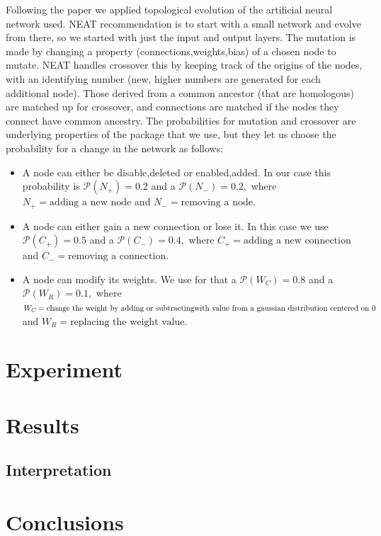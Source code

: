 \documentclass{article}
\begin{document}
Following the paper\cite{NEAT} we applied topological evolution of the artificial neural network used.
NEAT recommendation is to start with a small network and evolve from there, so we started with just the input and output layers.
The mutation is made by changing a property (connections,weights,bias) of a chosen node to mutate.
NEAT handles crossover this by keeping track of the origins of the nodes, with an identifying number (new, higher numbers are generated for each additional node).
Those derived from a common ancestor (that are homologous) are matched up for crossover, and connections are matched if the nodes they connect have common ancestry.
The probabilities for mutation and crossover are underlying properties of the package that we use, but they let us choose the probability for a change in the network as follows:
\begin{itemize}
  \item A node can either be disable,deleted or enabled,added.
In our case this probability is $\mathcal{P}(N_+)=0.2$ and a $\mathcal{P}(N_-)=0.2, $ where $N_+=\text{adding a new node}$ and $N_-=\text{removing a node}$.
  \item A node can either gain a new connection or lose it.
In this case we use $\mathcal{P}(C_+)=0.5$ and a $\mathcal{P}(C_-)=0.4, $ where $C_+=\text{adding a new connection}$ and $C_-=\text{removing a connection}$.
  \item A node can modify its weights.
We use for that a $\mathcal{P}(W_C)=0.8$ and a $\mathcal{P}(W_R)=0.1, $
where $W_C=\textrm{change the weight by adding or subtracting}\\ \textrm{with value from a gaussian distribution centered on 0 }$\\
and $W_R=\text{replacing the weight value}$.
\end{itemize}

\section{Experiment}

\section{Results}

\subsection{Interpretation}

\section{Conclusions}
\end{document}
